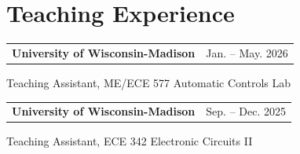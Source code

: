 \section{\sc Teaching Experience}
\begin{tabular}{@{}p{4in}>{\raggedleft\arraybackslash}p{1.5in}}
{\bf University of Wisconsin-Madison} & Jan. -- May. 2026\\
\end{tabular}
Teaching Assistant, ME/ECE 577 Automatic Controls Lab

\begin{tabular}{@{}p{4in}>{\raggedleft\arraybackslash}p{1.5in}}
{\bf University of Wisconsin-Madison} & Sep. -- Dec. 2025\\
\end{tabular}
Teaching Assistant, ECE 342 Electronic Circuits II